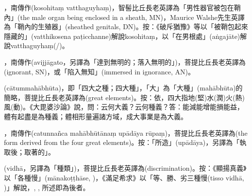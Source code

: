 \startitemgroup[noteitems]
\item{}，南傳作(kosohitaṃ vatthaguyhaṃ)，智髻比丘長老英譯為「男性器官被包在鞘內」(the male organ being enclosed in a sheath, MN)，Maurice Walshe先生英譯為「鞘內的生殖器」(sheathed genitals, DN)。按：《破斥猶豫》等以「被鞘包起來隱藏的」(vatthikosena paṭicchanne)解說kosohitaṃ，以「在男根處」(aṅgajāte)解說vatthaguyhaṃ(/)。
\stopitemgroup

\startitemgroup[noteitems]
\item{}，南傳作(avijjāgato，另譯為「達到無明的；落入無明的」)，菩提比丘長老英譯為(ignorant, SN)，或「陷入無知」(immersed in ignorance, AN)。
\stopitemgroup

\startitemgroup[noteitems]
\item{}(cātummahābhūta)，即「四大之種；四大種」，「大」為「大種」(mahābhūta)的簡略，菩提比丘長老英譯為(great elements)。按：依，四大指地(堅)水(潤)火(熱)風(動)。《大毘婆沙論》說，問：云何大義？云何種義？答：能減能增能損能益，體有起盡是為種義；體相形量遍諸方域，成大事業是為大義。
\item{}，南傳作(catunnañca mahābhūtānaṃ upādāya rūpaṃ)，菩提比丘長老英譯為(the form derived from the four great elements)。按：「所造」(upādāya)，另譯為「執取後；取著的」。
\stopitemgroup

\startitemgroup[noteitems]
\item{}(vidhā，另譯為「種類」)，菩提比丘長老英譯為(discrimination)。按：《顯揚真義》以「各種慢」(mānakoṭṭhāse, )，《滿足希求》以「等、勝、劣三種慢(tisso vidhā, )」解說，, , 所述即為後者。
\stopitemgroup

